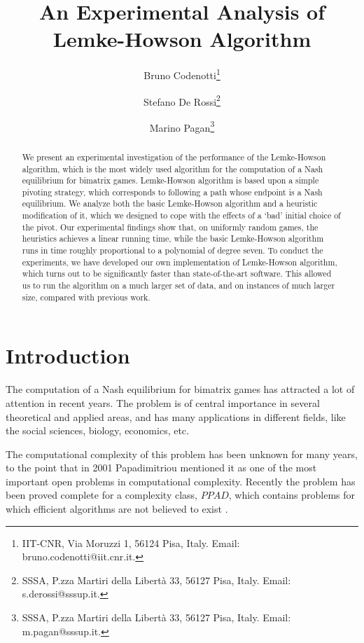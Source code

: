 \documentclass[11pt]{article}
\begin{document}
\title{An Experimental Analysis of
Lemke-Howson Algorithm}
\author{
Bruno Codenotti\thanks{IIT-CNR, Via Moruzzi 1, 56124 Pisa, Italy. Email:
bruno.codenotti@iit.cnr.it.} \and Stefano De Rossi\thanks{SSSA,
P.zza Martiri della Libert\`a 33, 56127 Pisa, Italy. Email:
s.derossi@sssup.it.} \and Marino
Pagan\thanks{SSSA, P.zza Martiri della Libert\`a 33, 56127 Pisa,
Italy. Email: m.pagan@sssup.it.}}
\date{}
\maketitle

\begin{abstract}
We present an experimental investigation of the performance of the
Lemke-Howson algorithm, which is the most widely used algorithm for
the computation of a Nash equilibrium for bimatrix games.
Lemke-Howson algorithm is based upon a simple pivoting strategy,
which corresponds to following a path whose endpoint is a Nash
equilibrium. We analyze both the basic Lemke-Howson algorithm and a
heuristic modification of it, which we designed to cope with the
effects of a `bad' initial  choice of the pivot. Our experimental
findings show that, on uniformly random games, the heuristics
achieves a linear running time, while the basic Lemke-Howson
algorithm runs in time roughly proportional to a polynomial of
degree seven. To conduct the experiments, we have developed our own
implementation of Lemke-Howson algorithm, which turns out to be
significantly faster than state-of-the-art software. This allowed us
to run the algorithm on a much larger set of data, and on instances
of much larger size, compared with previous work.
\end{abstract}

\section{Introduction}

The computation of a Nash equilibrium for bimatrix games has
attracted a lot of attention in recent years. The problem is of
central importance in several theoretical and applied areas, and has
many applications in different fields, like the social sciences,
biology, economics, etc.

The computational complexity of this problem has been unknown for
many years, to the point that in 2001 Papadimitriou \cite{pap}
mentioned it as one of the most important open problems in
computational complexity. Recently the problem has been proved
complete for a complexity class, $PPAD$, which contains problems for
which efficient algorithms are not believed to exist
\cite{chendeng}.
\end{document}
